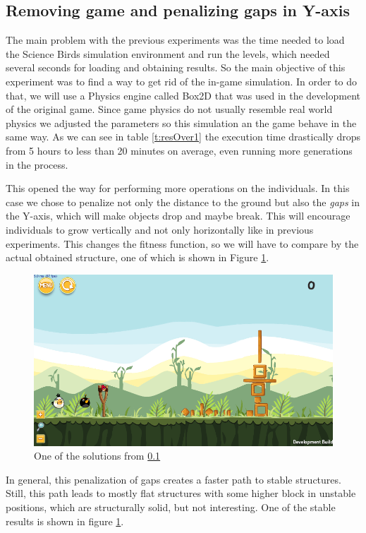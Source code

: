 \documentclass[a4paper,twoside]{article}
\begin{document}
\subsection{Removing game and penalizing gaps in Y-axis}\label{E5}

The main problem with the previous experiments was the time needed to
load the Science Birds simulation environment and run the levels,
which needed several seconds for loading and obtaining results. So the
main objective of this experiment was to find a way to get
rid of the in-game simulation. In order to do that, we will use a Physics engine
called Box2D \cite{catto2011box2d} that was used in the development of the original game.
Since game physics do not usually resemble real world physics we adjusted
the parameters so this simulation an the game behave in the same way.
As we can see in table \ref{t:resOver1} the execution time drastically
drops from 5 hours to less than 20 minutes on average, even running
more generations in the process.


This opened the way for performing more 
operations on the individuals. In this case we chose to penalize
not only the distance to the ground but also the \textit{gaps} in the
Y-axis, which will make objects drop and maybe break.
This will encourage individuals to grow vertically and not only horizontally
like in previous experiments. This changes the fitness function, so we
will have to compare by the actual obtained structure, one of which is
shown in Figure \ref{f:e5}.
%
 \begin{figure}
 	\centering
 	\includegraphics[scale=0.3]{E5.png}
 	\caption{One of the solutions from \ref{E5}}\label{f:e5}
      \end{figure}

In general, this penalization of gaps creates a faster path to stable
structures. Still, this path leads to mostly flat structures with 
some higher block in unstable positions, which
are structurally solid, but not interesting. One of the stable results is shown in figure \ref{f:e5}.
\end{document}
